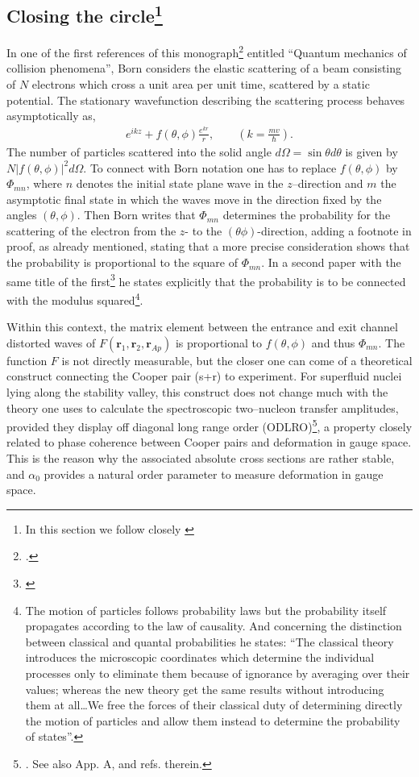 \subsection[Closing the circle]{Closing the circle\footnote{In this section we follow closely \cite{Pais:86}}}\label{S7.6.4}
In one of the first references of this monograph\footnote{\cite{Born:26}.} entitled ``Quantum mechanics of collision phenomena'', Born considers the elastic scattering of a beam consisting of $N$ electrons which cross a unit area per unit time, scattered by a static potential. The stationary wavefunction describing the scattering process behaves asymptotically as,
\begin{align}\label{eq7.4.2}
e^{ikz}+f(\theta,\phi)\frac{e^{kr}}{r},\quad\quad \left(k=\frac{mv}{\hbar}\right).
\end{align}
The number of particles scattered into the solid angle $d\Omega=\sin\theta d\theta$ is given by $N|f(\theta,\phi)|^2d\Omega$. To connect with Born notation one has to replace $f(\theta,\phi)$ by $\Phi_{mn}$, where $n$ denotes the initial state plane wave in the $z$--direction and $m$ the asymptotic final state in which the waves move in the direction fixed by the angles $(\theta,\phi)$. Then Born writes that $\Phi_{mn}$ determines the probability for the scattering of the electron from the $z$- to the $(\theta\phi)$-direction, adding a footnote in proof, as already mentioned, stating that a more precise consideration shows that the probability is proportional to the square of $\Phi_{mn}$. In a second paper with the same title of the first\footnote{\cite{Born:26b}} he states explicitly that the probability is to be connected with the modulus squared\footnote{The motion of particles follows probability laws but the probability itself propagates according to the law of causality. And concerning the distinction between classical and quantal probabilities he states: ``The classical theory introduces the microscopic coordinates which determine the individual processes only to eliminate them because of ignorance by averaging over their values; whereas the new theory get the same results without introducing them at all\dots We free the forces of their classical duty of determining directly the motion of particles and allow them instead to determine the probability of states''.}. 

Within this context, the matrix element between the entrance and exit channel distorted waves of $F(\mathbf r_1,\mathbf r_2,\mathbf r_{Ap})$ is proportional to $f(\theta,\phi)$ and thus $\Phi_{mn}$. The function $F$ is not directly measurable, but the closer one can come of a theoretical construct connecting the Cooper pair (s+r) to experiment. For superfluid nuclei lying along the stability valley, this construct does not change much with the theory one uses to calculate the spectroscopic two--nucleon transfer amplitudes,  provided they display off diagonal long range order (ODLRO)\footnote{\cite{Yang:62}. See also App. A, \cite{Potel:17} and refs. therein.}, a property closely related to phase coherence between Cooper pairs and deformation in gauge space. This is the reason why the associated absolute cross sections are rather stable, and $\alpha_0$ provides a natural order parameter to measure deformation in gauge space.


